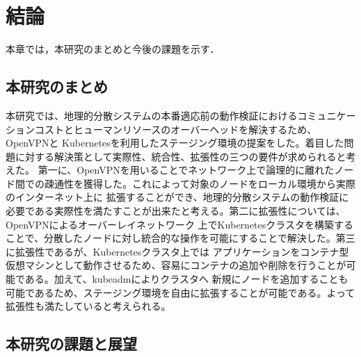 \chapter{結論}
\label{conclusion}

本章では，本研究のまとめと今後の課題を示す．

\section{本研究のまとめ}
\label{conclusion:conclusion}
本研究では、地理的分散システムの本番適応前の動作検証におけるコミュニケーションコストとヒューマンリソースのオーバーヘッドを解決するため、OpenVPNと
Kubernetesを利用したステージング環境の提案をした。着目した問題に対する解決策として実際性、統合性、拡張性の三つの要件が求められると考えた。
第一に、OpenVPNを用いることでネットワーク上で論理的に離れたノード間での疎通性を獲得した。これによって対象のノードをローカル環境から実際のインターネット上に
拡張することができ、地理的分散システムの動作検証に必要である実際性を満たすことが出来たと考える。第二に拡張性については、OpenVPNによるオーバーレイネットワーク
上でKubernetesクラスタを構築することで、分散したノードに対し統合的な操作を可能にすることで解決した。第三に拡張性であるが、Kubernetesクラスタ上では
アプリケーションをコンテナ型仮想マシンとして動作させるため、容易にコンテナの追加や削除を行うことが可能である。加えて、kubeadmによりクラスタへ
新規にノードを追加することも可能であるため、ステージング環境を自由に拡張することが可能である。よって拡張性も満たしていると考えられる。

\section{本研究の課題と展望}
\label{conclusion:issue}

